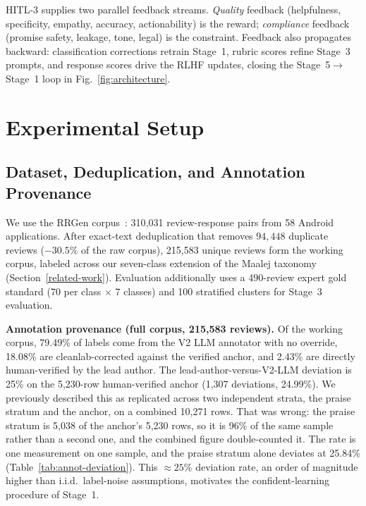 \documentclass[preprint,12pt]{elsarticle}
\begin{document}
  HITL-3 supplies two parallel feedback streams. \emph{Quality}
  feedback (helpfulness, specificity, empathy, accuracy, actionability)
  is the reward; \emph{compliance} feedback (promise safety, leakage,
  tone, legal) is the constraint. Feedback also propagates backward:
  classification corrections retrain Stage~1, rubric scores refine
  Stage~3 prompts, and response scores drive the RLHF updates, closing
  the Stage~5$\to$Stage~1 loop in Fig.~\ref{fig:architecture}.
\section{Experimental Setup}\label{experiments}

\subsection{Dataset, Deduplication, and Annotation Provenance}
We use the RRGen corpus~\cite{gao2019automating}: 310{,}031 review-response pairs from 58 Android applications. After exact-text deduplication that removes $94{,}448$ duplicate reviews ($-30.5\%$ of the raw corpus), 215{,}583 unique reviews form the working corpus, labeled across our seven-class extension of the Maalej taxonomy~\cite{maalej2015bug} (Section~\ref{related-work}). Evaluation additionally uses a 490-review expert gold standard (70 per class $\times$ 7 classes) and 100 stratified clusters for Stage~3 evaluation.

\textbf{Annotation provenance (full corpus, 215{,}583 reviews).} Of the working corpus, 79.49\% of labels come from the V2 LLM annotator with no override, 18.08\% are cleanlab-corrected against the verified anchor, and 2.43\% are directly human-verified by the lead author. The lead-author-versus-V2-LLM deviation is 25\% on the 5{,}230-row human-verified anchor
(1{,}307 deviations, 24.99\%). We previously described this as replicated across two independent
strata, the praise stratum and the anchor, on a combined 10{,}271 rows. That was wrong: the praise
stratum is 5{,}038 of the anchor's 5{,}230 rows, so it is 96\% of the same sample rather than a
second one, and the combined figure double-counted it. The rate is one measurement on one sample,
and the praise stratum alone deviates at 25.84\% (Table~\ref{tab:annot-deviation}). This $\approx 25\%$ deviation rate, an order of magnitude higher than i.i.d.\ label-noise assumptions, motivates the confident-learning procedure of Stage~1.
\end{document}
